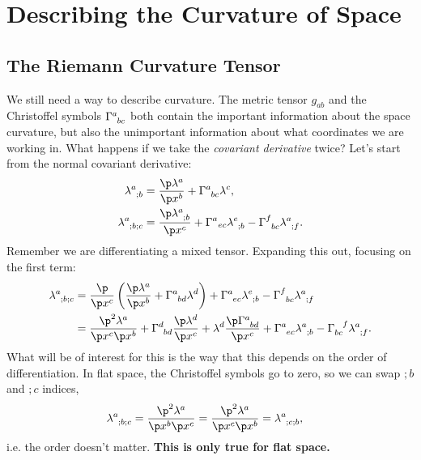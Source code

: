 \documentclass[a4paper, 11pt, normalem]{report}
\begin{document}
\chapter{Describing the Curvature of Space}
\section{The Riemann Curvature Tensor}
We still need a way to describe curvature.
The metric tensor $g_{ab}$ and the Christoffel symbols $\tensor{\Gamma}{^a_{bc}}$ both contain the important information about the space curvature, but also the unimportant information about what coordinates we are working in. 
What happens if we take the \emph{covariant derivative} twice?
Let's start from the normal covariant derivative:
\begin{align}
    \tensor{\lambda}{^a_{;b}} &= \frac{\p\lambda^a}{\p x^b} + \tensor{\Gamma}{^a_{bc}}\lambda^c, \\
    \tensor{\lambda}{^a_{;b;c}} &= \frac{\p\tensor{\lambda}{^a_{;b}}}{\p x^c} + \tensor{\Gamma}{^a}{_{ec}}\tensor{\lambda}{^e_{;b}} - \tensor{\Gamma}{^f_{bc}}\tensor{\lambda}{^a_{;f}}.
\end{align}
Remember we are differentiating a mixed tensor. 
Expanding this out, focusing on the first term:
\begin{align}
    \begin{split}
        \tensor{\lambda}{^a_{;b;c}} &= \frac{\p}{\p x^c}\left(\frac{\p\lambda^a}{\p x^b} + \tensor{\Gamma}{^a_{bd}}\lambda^d\right) + \tensor{\Gamma}{^a_{ec}}\tensor{\lambda}{^e_{;b}} - \tensor{\Gamma}{^f_{bc}}\tensor{\lambda}{^a_{;f}} \\
                                    &= \frac{\p^2\lambda^a}{\p x^c \p x^b} + \tensor{\Gamma}{^d_{bd}}\frac{\p\lambda^d}{\p x^c} + \lambda^d\frac{\p\tensor{\Gamma}{^a_{bd}}}{\p x^c} + \tensor{\Gamma}{^a_{ec}}\tensor{\lambda}{^a_{;b}}-\tensor{\Gamma}{_{bc}^f}\tensor{\lambda}{^a_{;f}}.
    \end{split}
\end{align}
What will be of interest for this is the way that this depends on the order of differentiation. 
In flat space, the Christoffel symbols go to zero, so we can swap $;b$ and $;c$ indices, 
\begin{align}
    \tensor{\lambda}{^a_{;b;c}} &= \frac{\p^2\lambda^a}{\p x^b\p x^c} = \frac{\p^2\lambda^a}{\p x^c\p x^b} = \tensor{\lambda}{^a_{;c;b}},
\end{align}
i.e. the order doesn't matter. 
\textbf{This is only true for flat space.}
\end{document}
